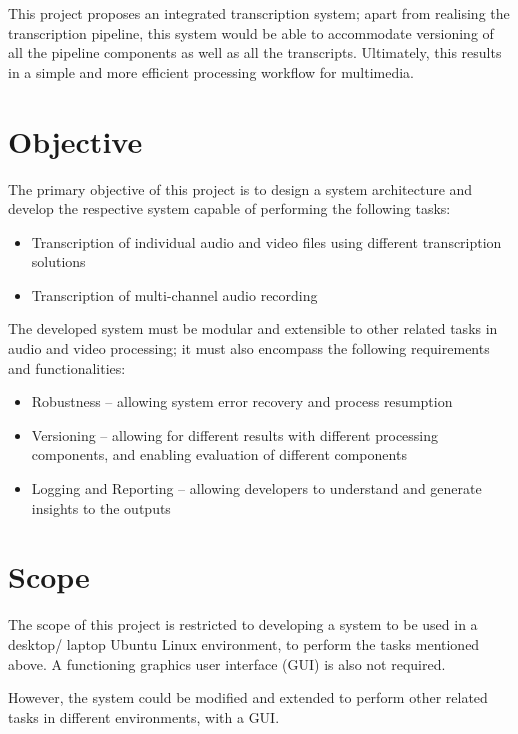 This project proposes an integrated transcription system; apart from realising the transcription pipeline, this system would be able to accommodate versioning of all the pipeline components as well as all the transcripts. Ultimately, this results in a simple and more efficient processing workflow for multimedia.

\section{Objective}

The primary objective of this project is to design a system architecture and develop the respective system capable of performing the following tasks:

\begin{itemize}
    \item Transcription of individual audio and video files using different transcription solutions
    \item Transcription of multi-channel audio recording
\end{itemize}

The developed system must be modular and extensible to other related tasks in audio and video processing; it must also encompass the following requirements and functionalities:

\begin{itemize}
    \item Robustness -- allowing system error recovery and process resumption
    \item Versioning -- allowing for different results with different processing components, and enabling evaluation of different components
    \item Logging and Reporting -- allowing developers to understand and generate insights to the outputs
\end{itemize}

\section{Scope}

The scope of this project is restricted to developing a system to be used in a desktop/ laptop Ubuntu Linux environment, to perform the tasks mentioned above. A functioning graphics user interface (GUI) is also not required.

However, the system could be modified and extended to perform other related tasks in different environments, with a GUI.

